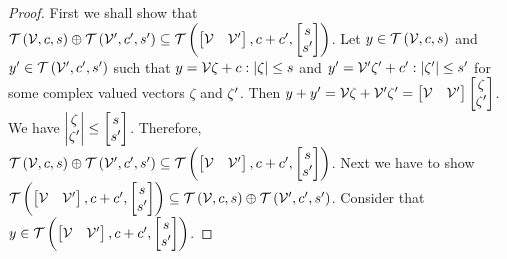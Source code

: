 \begin{proof}
First we shall show that \\$\mathit{\mathcal{T}}\left(\mathcal{V},c,s\right)\oplus \mathit{\mathcal{T}}\left(\mathcal{V}^\prime,c^\prime,s^\prime\right)
\subseteq \mathit{\mathcal{T}}\left(\begin{bmatrix}\mathcal{V}
& \mathcal{V}^\prime\end{bmatrix},c+c^\prime,\begin{bmatrix}s\\s^\prime\end{bmatrix}\right)$.
Let $y\in\mathit{\mathcal{T}}\left(\mathcal{V},c,s\right)$ and
$y^\prime\in\mathit{\mathcal{T}}\left(\mathcal{V}^\prime,c^\prime,s^\prime\right)$ such that
$y=\mathcal{V}\zeta+c:\left|\zeta\right|\leq s$ and
$y^\prime=\mathcal{V}^\prime\zeta^\prime+c^\prime:\left|\zeta^\prime\right|\leq s^\prime$
for some complex valued vectors $\zeta$ and $\zeta^\prime$.  Then
$y+y^\prime = \mathcal{V}\zeta+\mathcal{V}^\prime\zeta^\prime = \begin{bmatrix} \mathcal{V}
& \mathcal{V}^\prime\end{bmatrix}\begin{bmatrix} \zeta\\\zeta^\prime\end{bmatrix}$.
We have
$\left|\begin{matrix} \zeta\\\zeta^\prime\end{matrix}\right|\leq\begin{bmatrix}s\\s^\prime\end{bmatrix}$.
Therefore,
$\mathit{\mathcal{T}}\left(\mathcal{V},c,s\right)\oplus \mathit{\mathcal{T}}\left(\mathcal{V}^\prime,c^\prime,s^\prime\right)
\subseteq \mathit{\mathcal{T}}\left(\begin{bmatrix}\mathcal{V}
& \mathcal{V}^\prime\end{bmatrix},c+c^\prime,\begin{bmatrix}s\\s^\prime\end{bmatrix}\right)$.
Next we have to show $\mathit{\mathcal{T}}\left(\begin{bmatrix}\mathcal{V}
& \mathcal{V}^\prime\end{bmatrix},c+c^\prime,\begin{bmatrix}s\\s^\prime\end{bmatrix}\right) \subseteq \mathit{\mathcal{T}}\left(\mathcal{V},c,s\right)\oplus \mathit{\mathcal{T}}\left(\mathcal{V}^\prime,c^\prime,s^\prime\right)$.
Consider that $y\in\mathit{\mathcal{T}}\left(\begin{bmatrix}\mathcal{V}
& \mathcal{V}^\prime\end{bmatrix},c+c^\prime,\begin{bmatrix}s\\s^\prime\end{bmatrix}\right)$.

\end{proof}
